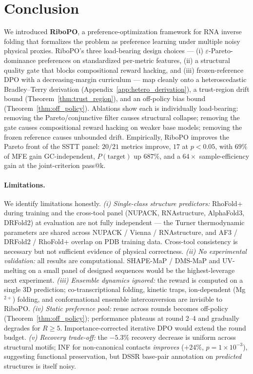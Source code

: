 \section{Conclusion}

We introduced \textbf{RiboPO}, a preference-optimization framework for RNA inverse folding that formalizes the problem as preference learning under multiple noisy physical proxies. RiboPO's three load-bearing design choices --- (i) $\varepsilon$-Pareto-dominance preferences on standardized per-metric features, (ii) a structural quality gate that blocks compositional reward hacking, and (iii) frozen-reference DPO with a decreasing-margin curriculum --- map cleanly onto a heteroscedastic Bradley--Terry derivation (Appendix~\ref{app:hetero_derivation}), a trust-region drift bound (Theorem~\ref{thm:trust_region}), and an off-policy bias bound (Theorem~\ref{thm:off_policy}). Ablations show each is individually load-bearing: removing the Pareto/conjunctive filter causes structural collapse; removing the gate causes compositional reward hacking on weaker base models; removing the frozen reference causes unbounded drift. Empirically, RiboPO improves the Pareto front of the SSTT panel: $20/21$ metrics improve, $17$ at $p<0.05$, with $69\%$ of MFE gain GC-independent, $P(\text{target})$ up $687\%$, and a $64\times$ sample-efficiency gain at the joint-criterion pass@k.

\paragraph{Limitations.}
We identify limitations honestly. \emph{(i) Single-class structure predictors:} RhoFold+ during training and the cross-tool panel (NUPACK, RNAstructure, AlphaFold3, DRFold2) at evaluation are not fully independent --- the Turner thermodynamic parameters are shared across NUPACK / Vienna / RNAstructure, and AF3 / DRFold2 / RhoFold+ overlap on PDB training data. Cross-tool consistency is necessary but not sufficient evidence of physical correctness. \emph{(ii) No experimental validation:} all results are computational. SHAPE-MaP / DMS-MaP and UV-melting on a small panel of designed sequences would be the highest-leverage next experiment. \emph{(iii) Ensemble dynamics ignored:} the reward is computed on a single 3D prediction; co-transcriptional folding, kinetic traps, ion-dependent (Mg$^{2+}$) folding, and conformational ensemble interconversion are invisible to RiboPO. \emph{(iv) Static preference pool:} reuse across rounds becomes off-policy (Theorem~\ref{thm:off_policy}); performance plateaus at round 2--4 and gradually degrades for $R \geq 5$. Importance-corrected iterative DPO would extend the round budget. \emph{(v) Recovery trade-off:} the $-5.3\%$ recovery decrease is uniform across structural motifs; INF for non-canonical contacts \emph{improves} ($+24\%$, $p = 1\!\times\!10^{-3}$), suggesting functional preservation, but DSSR base-pair annotation on \emph{predicted} structures is itself noisy.

